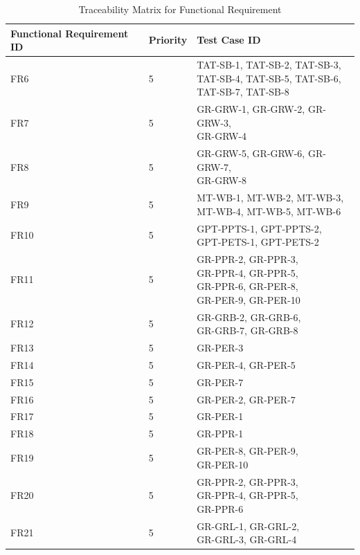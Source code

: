 \documentclass[12pt, titlepage]{article}
\begin{document}
\begin{table}[ht]
\begin{tabular}{|p{3cm}|p{3cm}|p{7cm}|}
 \hline
 Functional Requirement ID & Priority & Test Case ID\\
 
 
  \hline
 FR6 & 5 & \makecell[l]{TAT-SB-1, TAT-SB-2, TAT-SB-3,\\ TAT-SB-4, TAT-SB-5, TAT-SB-6,\\ TAT-SB-7, TAT-SB-8}\\
  \hline
 FR7 & 5 & \makecell[l]{GR-GRW-1, GR-GRW-2, GR-GRW-3,\\ GR-GRW-4}\\
  \hline
  FR8 & 5 & \makecell[l]{GR-GRW-5, GR-GRW-6, GR-GRW-7,\\ GR-GRW-8}\\
 \hline
 FR9 & 5 & \makecell[l]{MT-WB-1, MT-WB-2, MT-WB-3,\\MT-WB-4, MT-WB-5, MT-WB-6}\\
  \hline
 FR10 & 5 & \makecell[l]{GPT-PPTS-1, GPT-PPTS-2,\\ GPT-PETS-1, GPT-PETS-2}\\
  \hline
 FR11 & 5 & \makecell[l]{GR-PPR-2, GR-PPR-3, \\GR-PPR-4, GR-PPR-5, \\GR-PPR-6, GR-PER-8, \\GR-PER-9, GR-PER-10}\\
  \hline
 FR12 & 5 & \makecell[l]{GR-GRB-2, GR-GRB-6, \\GR-GRB-7, GR-GRB-8}\\
  \hline
 FR13 & 5 & GR-PER-3\\
  \hline
 FR14 & 5 & GR-PER-4, GR-PER-5\\
  \hline
 FR15 & 5 & GR-PER-7\\
  \hline
 FR16 & 5 & GR-PER-2, GR-PER-7\\
  \hline
 FR17 & 5 & GR-PER-1\\
  \hline
 FR18 & 5 & GR-PPR-1\\
  \hline
 FR19 & 5 & \makecell[l]{GR-PER-8, GR-PER-9, \\GR-PER-10}\\
  \hline
 FR20 & 5 & \makecell[l]{GR-PPR-2, GR-PPR-3, \\GR-PPR-4, GR-PPR-5, \\GR-PPR-6}\\
  \hline
 FR21 & 5 & \makecell[l]{GR-GRL-1, GR-GRL-2, \\GR-GRL-3, GR-GRL-4}\\
  \hline
\end{tabular}
\caption{Traceability Matrix for Functional Requirement}
\label{table: Traceability Matrix for Functional Requirement}
\end{table}
\end{document}
